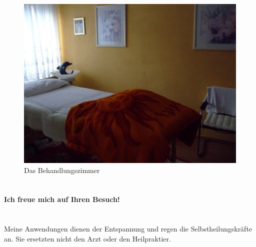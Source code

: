 \documentclass[10pt,foldmark,notumble]{leaflet}
\begin{document}
\newpage
\vfill
\begin{figure}[h]
\includegraphics [scale=.25]{Bild1.jpg}
\caption{Das Behandlungszimmer}
 \end{figure}


\section{ }
\centerline {\LARGE {\bf {Ich freue mich auf Ihren Besuch!}}}


\section{ }
Meine Anwendungen dienen der Entspannung und regen die Selbstheilungskräfte an. Sie ersetzten nicht den Arzt oder den Heilpraktier. 
\vfill
\end{document}
